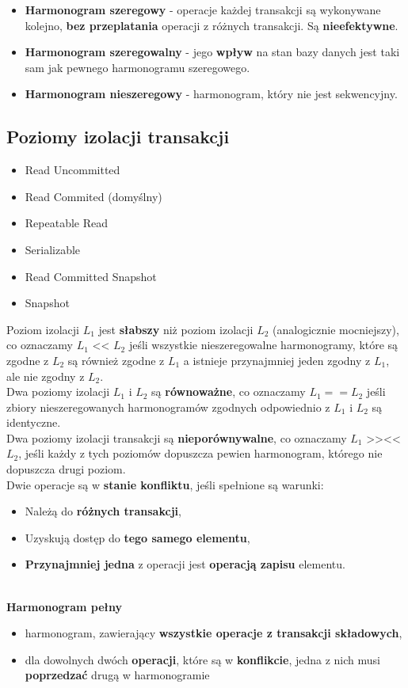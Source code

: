 \documentclass[a4paper]{article}
\begin{document}
\begin{itemize}
    \item \textbf{Harmonogram szeregowy} - operacje każdej transakcji są wykonywane kolejno, \textbf{bez przeplatania} operacji z różnych transakcji. Są \textbf{nieefektywne}.
    \item \textbf{Harmonogram szeregowalny} - jego \textbf{wpływ} na stan bazy danych jest taki sam jak pewnego harmonogramu szeregowego.
    \item \textbf{Harmonogram nieszeregowy} - harmonogram, który nie jest sekwencyjny.
\end{itemize}

\subsection{Poziomy izolacji transakcji}
\begin{itemize}
    \item Read Uncommitted
    \item Read Commited (domyślny)
    \item Repeatable Read
    \item Serializable
    \item Read Committed Snapshot
    \item Snapshot
\end{itemize}
Poziom izolacji $L_1$ jest \textbf{słabszy} niż poziom izolacji $L_2$ (analogicznie mocniejszy), co oznaczamy $L_1$ << $L_2$ jeśli wszystkie nieszeregowalne harmonogramy, które są zgodne z $L_2$ są również zgodne z $L_1$ a istnieje przynajmniej jeden zgodny z $L_1$, ale nie zgodny z $L_2$.\\
Dwa poziomy izolacji $L_1$ i $L_2$ są \textbf{równoważne}, co oznaczamy $L_1 == L_2$ jeśli zbiory nieszeregowanych harmonogramów zgodnych odpowiednio z $L_1$ i $L_2$ są identyczne.\\
Dwa poziomy izolacji transakcji są \textbf{nieporównywalne}, co oznaczamy $L_1$ >><< $L_2$, jeśli każdy z tych poziomów dopuszcza pewien harmonogram, którego nie dopuszcza drugi poziom.\\

Dwie operacje są w \textbf{stanie konfliktu}, jeśli spełnione są warunki:
\begin{itemize}
    \item Należą do \textbf{różnych transakcji}, 
    \item Uzyskują dostęp do \textbf{tego samego elementu},
    \item \textbf{Przynajmniej jedna} z operacji jest \textbf{operacją zapisu} elementu.
\end{itemize}
\hfill \\
\textbf{Harmonogram pełny}
\begin{itemize}
    \item harmonogram, zawierający \textbf{wszystkie operacje z transakcji składowych},
    \item dla dowolnych dwóch \textbf{operacji}, które są w \textbf{konflikcie}, jedna z nich musi \textbf{poprzedzać} drugą w harmonogramie
\end{itemize}
\end{document}

